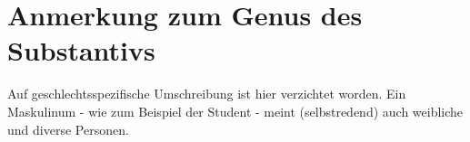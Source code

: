
\section*{Anmerkung zum Genus des Substantivs}

Auf geschlechtsspezifische Umschreibung ist hier verzichtet worden. Ein Maskulinum - wie zum Beispiel der Student - meint (selbstredend) auch weibliche und diverse Personen.
